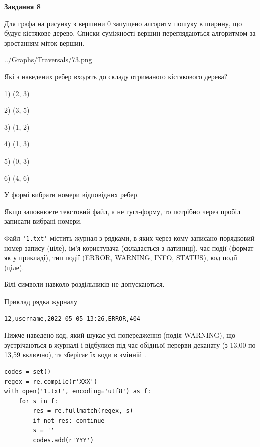 \documentclass[12pt, ukrainian]{article}
\def\code#1{\Verb!#1!}
\begin{document}
{\begin {large}
{\begin {center}\textbf{Завдання 8}\end {center}}\par
Для графа на рисунку з вершини 0 запущено алгоритм пошуку в ширину, що будує кістякове дерево. Списки суміжності вершин переглядаються алгоритмом за зростанням міток вершин.\par
\begin{center}
	{../Graphs/Traversals/73.png}
\end{center}
\par Які з наведених ребер входять до складу отриманого кістякового дерева?\par
1) (2, 3)\par
2) (3, 5)\par
3) (1, 2)\par
4) (1, 3)\par
5) (0, 3)\par
6) (4, 6)\par
{\vskip 15pt} У формі вибрати номери відповідних ребер.


Якщо заповнюєте текстовий файл, а не гугл-форму, то потрібно через пробіл записа\-ти вибрані номери.\par
\newpage


Файл \code{'1.txt'} містить журнал з рядками, в яких через кому записано поряд\-ко\-вий номер запису (ціле), ім'я користувача (складається з латиниці), час події (фор\-мат як у прикладі), тип події (ERROR, WARNING, INFO, STATUS), код події (ціле).

Білі символи навколо роздільників не допускаються.

Приклад рядка журналу



\begin{verbatim}
12,username,2022-05-05 13:26,ERROR,404
\end{verbatim}


Нижче наведено код, який шукає усі попередження (подія WARNING), що зустрі\-ча\-ються в журналі і відбулися під час обідньої перерви деканату (з 13,00 по 13,59 включно), та зберігає їх коди в змінній .



\begin{verbatim}
codes = set()
regex = re.compile(r'XXX')
with open('1.txt', encoding='utf8') as f:
    for s in f:
        res = re.fullmatch(regex, s)
        if not res: continue
        s = ''
        codes.add(r'YYY')
\end{verbatim}





\end{large}}
\end{document}
